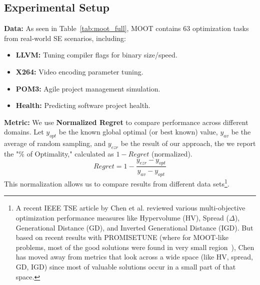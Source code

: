 \documentclass[runningheads]{llncs}
\begin{document}
\subsection{Experimental Setup}
\textbf{Data:} As seen in Table~\ref{tab:moot_full},
MOOT contains 63 optimization tasks from real-world SE scenarios, 
including:
\begin{itemize}
    \item \textbf{LLVM:} Tuning compiler flags for binary size/speed.
    \item \textbf{X264:} Video encoding parameter tuning.
    \item \textbf{POM3:} Agile project management simulation.
    \item \textbf{Health:} Predicting software project health.
\end{itemize}

\textbf{Metric:} We use \textbf{Normalized Regret} to compare performance 
across different domains. Let $y_{opt}$ be the known global optimal (or best 
known) value, $y_{av}$ be the average of random sampling, and $y_{ezr}$ 
be the result of our approach, the we 
 report the "\% of Optimality," calculated as $1 - Regret$ (normalized).
\begin{equation}\label{regret}
    Regret = 1 - \frac{y_{ezr} - y_{opt}}{y_{av} - y_{opt}}
\end{equation}
This normalization allows us to compare results from different data sets\footnote{A recent  IEEE TSE article by Chen et al. \cite{ref41} reviewed various multi-objective optimization performance measures like Hypervolume (HV), Spread ($\Delta$), Generational Distance (GD), and Inverted Generational Distance (IGD).
But based on recent results with   PROMISETUNE   (where for MOOT-like problems, most of the good solutions were found in very small region~\cite{Chen26Promise}), Chen has moved away from    metrics that look across a wide space (like HV, spread, GD, IGD)  since most of  valuable solutions occur in a small part of that space.}.

\end{document}
